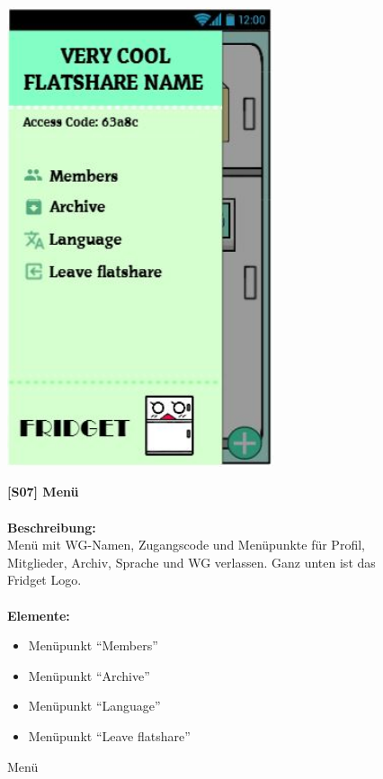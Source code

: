 \documentclass[a4paper]{scrreprt}
\begin{document}
    	\begin{figure}[h]
    		\begin{minipage}[b]{0.4\linewidth}
    			\flushright
    			\centering
    			\includegraphics[width=0.7\textwidth]{fridget_menu.JPG}
    			\caption{Menü}
    			\label{fig:figure1}
    			\vspace{20mm}
    		\end{minipage}
    		\hspace{0.5cm}
    		\begin{minipage}[b]{0.55\linewidth}
    			\flushleft
    			\textbf{{[}S07{]} Menü} \\
    			\hfill
    			\\\textbf{Beschreibung:} \\
    			Menü mit WG-Namen, Zugangscode und
    			Menüpunkte für Profil, Mitglieder, Archiv,
    			Sprache und WG verlassen. Ganz unten ist das
    			Fridget Logo.\\
    			
    			\hfill 
    			\\\textbf{Elemente:}
    			\begin{itemize}
    				\renewcommand\labelitemi{--}
    				\item Menüpunkt ``Members”
    				\item Menüpunkt ``Archive”
    				\item Menüpunkt ``Language”
    				\item Menüpunkt ``Leave flatshare”
    				

\end{itemize}
\end{minipage}
\end{figure}
\end{document}

